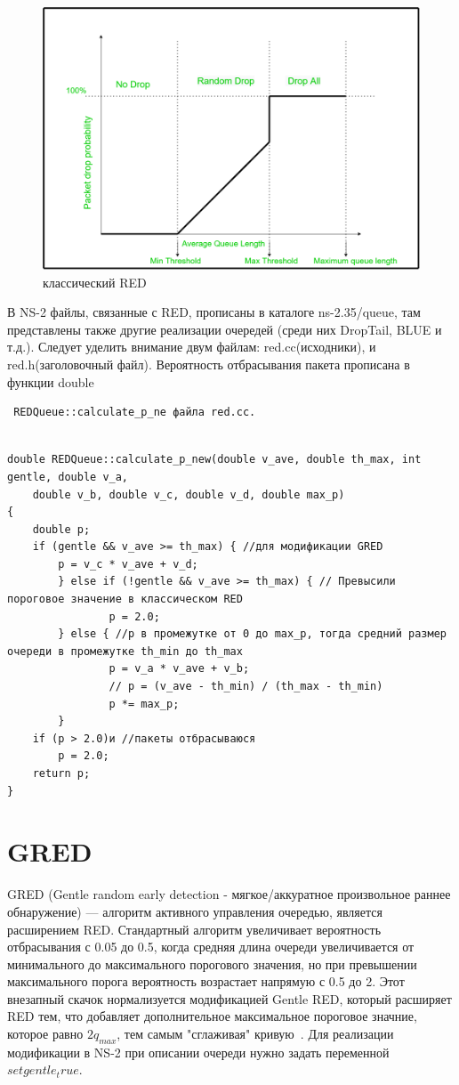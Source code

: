 \begin{figure}[!h]
  \centering
  \includegraphics[width=0.7\linewidth]{image/RED.png}
  \caption{классический RED}
  \label{fig:2.1}
\end{figure}


В NS-2 файлы, связанные с RED, прописаны в каталоге ns-2.35/queue, там представлены также другие реализации очередей (среди них DropTail, BLUE и т.д.). Следует уделить внимание двум файлам: red.cc(исходники), и red.h(заголовочный файл). Вероятность отбрасывания пакета прописана в функции double \begin{verbatim} REDQueue::calculate_p_ne файла red.cc. \end{verbatim} 

\begin{verbatim}

double REDQueue::calculate_p_new(double v_ave, double th_max, int gentle, double v_a, 
	double v_b, double v_c, double v_d, double max_p)
{
	double p;
	if (gentle && v_ave >= th_max) { //для модификации GRED
		p = v_c * v_ave + v_d;
        } else if (!gentle && v_ave >= th_max) { // Превысили пороговое значение в классическом RED
                p = 2.0;
        } else { //p в промежутке от 0 до max_p, тогда средний размер очереди в промежутке th_min до th_max
                p = v_a * v_ave + v_b;
                // p = (v_ave - th_min) / (th_max - th_min)
                p *= max_p; 
        }
	if (p > 2.0)и //пакеты отбрасываюся
		p = 2.0;
	return p;
}
\end{verbatim}

\section{GRED} 

GRED (Gentle random early detection - мягкое/аккуратное произвольное раннее обнаружение) — алгоритм активного управления очередью, является расширением RED.
Стандартный алгоритм увеличивает вероятность отбрасывания с 0.05 до 0.5, когда средняя длина очереди увеличивается от минимального до максимального порогового значения, 
но при превышении максимального порога вероятность возрастает напрямую с 0.5 до 2. 
Этот внезапный скачок нормализуется модификацией Gentle RED, который расширяет RED тем, что добавляет дополнительное максимальное пороговое значние, которое равно $2q_{max}$, тем самым           "сглаживая" кривую~\cite{GRED}. Для реализации модификации в NS-2 при описании очереди нужно задать переменной $ set gentle_ true$. 

